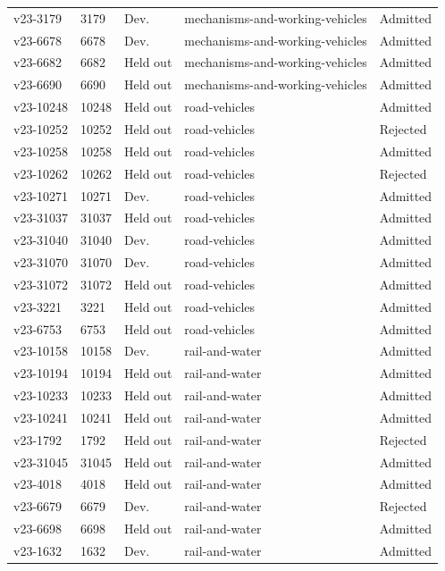 \begin{longtable}{lllp{}l}
v23-3179 & 3179 & Dev. & mechanisms-and-working-vehicles & Admitted\\
v23-6678 & 6678 & Dev. & mechanisms-and-working-vehicles & Admitted\\
v23-6682 & 6682 & Held out & mechanisms-and-working-vehicles & Admitted\\
v23-6690 & 6690 & Held out & mechanisms-and-working-vehicles & Admitted\\
v23-10248 & 10248 & Held out & road-vehicles & Admitted\\
v23-10252 & 10252 & Held out & road-vehicles & Rejected\\
v23-10258 & 10258 & Held out & road-vehicles & Admitted\\
v23-10262 & 10262 & Held out & road-vehicles & Rejected\\
v23-10271 & 10271 & Dev. & road-vehicles & Admitted\\
v23-31037 & 31037 & Held out & road-vehicles & Admitted\\
v23-31040 & 31040 & Dev. & road-vehicles & Admitted\\
v23-31070 & 31070 & Dev. & road-vehicles & Admitted\\
v23-31072 & 31072 & Held out & road-vehicles & Admitted\\
v23-3221 & 3221 & Held out & road-vehicles & Admitted\\
v23-6753 & 6753 & Held out & road-vehicles & Admitted\\
v23-10158 & 10158 & Dev. & rail-and-water & Admitted\\
v23-10194 & 10194 & Held out & rail-and-water & Admitted\\
v23-10233 & 10233 & Held out & rail-and-water & Admitted\\
v23-10241 & 10241 & Held out & rail-and-water & Admitted\\
v23-1792 & 1792 & Held out & rail-and-water & Rejected\\
v23-31045 & 31045 & Held out & rail-and-water & Admitted\\
v23-4018 & 4018 & Held out & rail-and-water & Admitted\\
v23-6679 & 6679 & Dev. & rail-and-water & Rejected\\
v23-6698 & 6698 & Held out & rail-and-water & Admitted\\
v23-1632 & 1632 & Dev. & rail-and-water & Admitted\\
\end{longtable}
